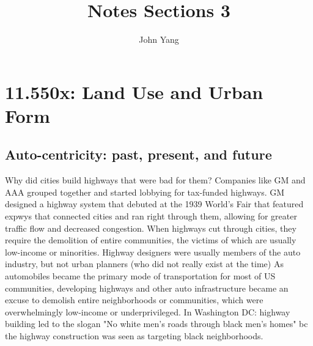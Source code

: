 \documentclass{article}
\title{Notes Sections 3} %
\author{John Yang}
\begin{document}
    \maketitle
    \tableofcontents
    \section{11.550x: Land Use and Urban Form}
    \subsection{Auto-centricity: past, present, and future}
    \begin{outline}
        \1 Why did cities build highways that were bad for them?
            \2 Companies like GM and AAA grouped together and started lobbying for tax-funded highways. 
            \2 GM designed a highway system that debuted at the 1939 World's Fair that featured expwys that connected cities and ran right through them, allowing for greater traffic flow and decreased congestion. 
            \2 When highways cut through cities, they require the demolition of entire communities, the victims of which are usually low-income or minorities. 
            \2 Highway designers were usually members of the auto industry, but not urban planners (who did not really exist at the time)
        \1 As automobiles became the primary mode of transportation for most of US communities, developing highways and other auto infrastructure became an excuse to demolish entire neighborhoods or communities, which were overwhelmingly low-income or underprivileged. 
        \1 In Washington DC: highway building led to the slogan "No white men's roads through black men's homes" bc the highway construction was seen as targeting black neighborhoods. 
    \end{outline}
\end{document}
